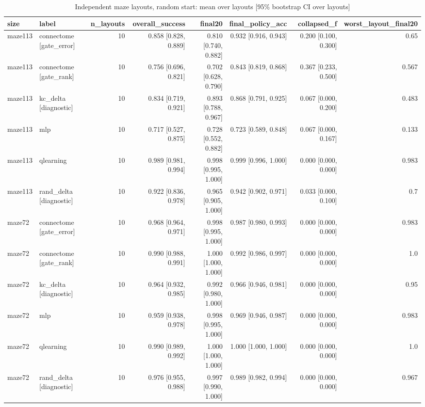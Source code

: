 \begin{table}[t]
\centering
\small
\begin{tabular}{llrrrrrr}
\toprule
size & label & n\_layouts & overall\_success & final20 & final\_policy\_acc & collapsed\_f & worst\_layout\_final20 \\
\midrule
maze113 & connectome [gate\_error] & 10 & 0.858 [0.828, 0.889] & 0.810 [0.740, 0.882] & 0.932 [0.916, 0.943] & 0.200 [0.100, 0.300] & 0.65 \\
maze113 & connectome [gate\_rank] & 10 & 0.756 [0.696, 0.821] & 0.702 [0.628, 0.790] & 0.843 [0.819, 0.868] & 0.367 [0.233, 0.500] & 0.567 \\
maze113 & kc\_delta [diagnostic] & 10 & 0.834 [0.719, 0.921] & 0.893 [0.788, 0.967] & 0.868 [0.791, 0.925] & 0.067 [0.000, 0.200] & 0.483 \\
maze113 & mlp & 10 & 0.717 [0.527, 0.875] & 0.728 [0.552, 0.882] & 0.723 [0.589, 0.848] & 0.067 [0.000, 0.167] & 0.133 \\
maze113 & qlearning & 10 & 0.989 [0.981, 0.994] & 0.998 [0.995, 1.000] & 0.999 [0.996, 1.000] & 0.000 [0.000, 0.000] & 0.983 \\
maze113 & rand\_delta [diagnostic] & 10 & 0.922 [0.836, 0.978] & 0.965 [0.905, 1.000] & 0.942 [0.902, 0.971] & 0.033 [0.000, 0.100] & 0.7 \\
maze72 & connectome [gate\_error] & 10 & 0.968 [0.964, 0.971] & 0.998 [0.995, 1.000] & 0.987 [0.980, 0.993] & 0.000 [0.000, 0.000] & 0.983 \\
maze72 & connectome [gate\_rank] & 10 & 0.990 [0.988, 0.991] & 1.000 [1.000, 1.000] & 0.992 [0.986, 0.997] & 0.000 [0.000, 0.000] & 1.0 \\
maze72 & kc\_delta [diagnostic] & 10 & 0.964 [0.932, 0.985] & 0.992 [0.980, 1.000] & 0.966 [0.946, 0.981] & 0.000 [0.000, 0.000] & 0.95 \\
maze72 & mlp & 10 & 0.959 [0.938, 0.978] & 0.998 [0.995, 1.000] & 0.969 [0.946, 0.987] & 0.000 [0.000, 0.000] & 0.983 \\
maze72 & qlearning & 10 & 0.990 [0.989, 0.992] & 1.000 [1.000, 1.000] & 1.000 [1.000, 1.000] & 0.000 [0.000, 0.000] & 1.0 \\
maze72 & rand\_delta [diagnostic] & 10 & 0.976 [0.955, 0.988] & 0.997 [0.990, 1.000] & 0.989 [0.982, 0.994] & 0.000 [0.000, 0.000] & 0.967 \\
\bottomrule
\end{tabular}
\caption{Independent maze layouts, random start: mean over layouts [95\% bootstrap CI over layouts]}
\label{tab:layouts_summary}
\end{table}